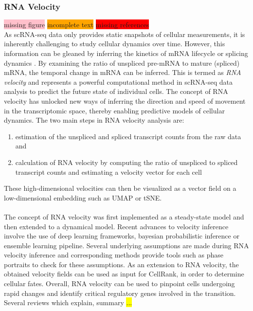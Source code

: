 \subsubsection{RNA Velocity}
 \colorbox{pink}{missing figure} \colorbox{orange}{incomplete text} \colorbox{red}{missing references}\\
As scRNA-seq data only provides static snapshots of cellular measurements, it is inherently challenging to study cellular dynamics over time. However, this information can be gleaned by inferring the kinetics of mRNA lifecycle or splicing dynamics %
. By examining the ratio of unspliced pre-mRNA to mature (spliced) mRNA, the temporal change in mRNA can be inferred. This is termed as \textit{RNA velocity} and represents a powerful computational method in scRNA-seq data analysis to predict the future state of individual cells. The concept of RNA velocity has unlocked new ways of inferring the direction and speed of movement in the transcriptomic space, thereby enabling predictive models of cellular dynamics. The two main steps in RNA velocity analysis are:
\begin{enumerate}
    \item estimation of the unspliced and spliced transcript counts from the raw data and
    \item calculation of RNA velocity by computing the ratio of unspliced to spliced transcript counts and estimating a velocity vector for each cell
\end{enumerate}
These high-dimensional velocities can then be visualized as a vector field on a low-dimensional embedding such as UMAP or tSNE.\\\\
The concept of RNA velocity was first implemented as a steady-state model and then extended to a dynamical model. Recent advances to velocity inference involve the use of deep learning frameworks, bayesian probabilistic inference or ensemble learning pipeline. Several underlying assumptions are made during RNA velocity inference and corresponding methods provide tools such as phase portraits to check for these assumptions. As an extension to RNA velocity, the obtained velocity fields can be used as input for CellRank, in order to determine cellular fates. Overall, RNA velocity can be used to pinpoint cells undergoing rapid changes and identify critical regulatory genes involved in the transition. Several reviews which explain, summary \hl{...}


